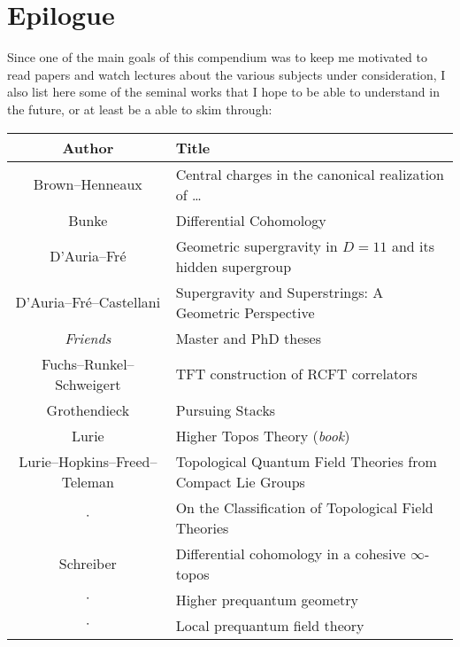 \chapter{Epilogue}

   Since one of the main goals of this compendium was to keep me motivated to read papers and watch lectures about the various subjects under consideration, I also list here some of the seminal works that I hope to be able to understand in the future, or at least be a able to skim through:

   \begin{center}
       \begin{tabular}{|c|l|}
           \hline
           Author&Title\\
           \hline
           Brown--Henneaux&Central charges in the canonical realization of \ldots\\
			Bunke&Differential Cohomology\\
			D'Auria--Fr\'e&Geometric supergravity in $D=11$ and its hidden supergroup\\
			D'Auria--Fr\'e--Castellani&Supergravity and Superstrings: A Geometric Perspective\\
           \textit{Friends}&Master and PhD theses\\
           Fuchs--Runkel--Schweigert&TFT construction of RCFT correlators\\
           Grothendieck&Pursuing Stacks\\
           Lurie&Higher Topos Theory (\textit{book})\\
           Lurie--Hopkins--Freed--Teleman&Topological Quantum Field Theories from Compact Lie Groups\\
           $\cdot$&On the Classification of Topological Field Theories\\
           Schreiber&Differential cohomology in a cohesive $\infty$-topos\\
           $\cdot$&Higher prequantum geometry\\
           $\cdot$&Local prequantum field theory\\
           \hline
       \end{tabular}
   \end{center}